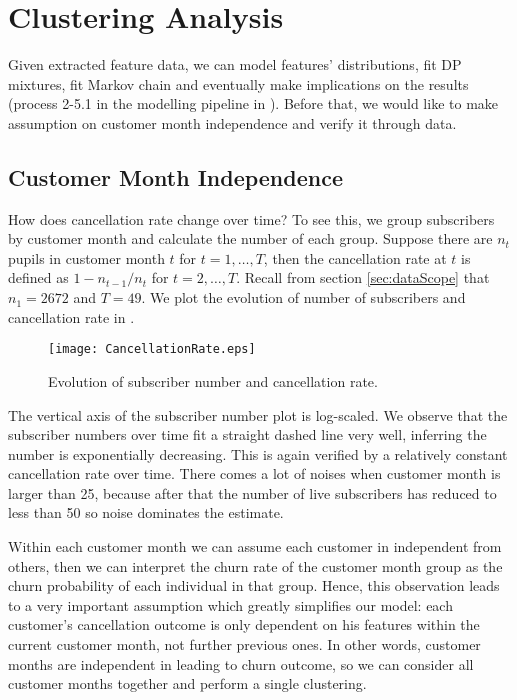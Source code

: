 \section{Clustering Analysis}
\label{sec:clustering}

Given extracted feature data, we can model features' distributions, fit DP mixtures, fit Markov chain and eventually make implications on the results (process 2-5.1 in the modelling pipeline in ). Before that, we would like to make assumption on customer month independence and verify it through data.

\subsection{Customer Month Independence}

How does cancellation rate change over time? To see this, we group subscribers by customer month and calculate the number of each group. Suppose there are $n_t$ pupils in customer month $t$ for $t=1,\dots,T$, then the cancellation rate at $t$ is defined as $1-n_{t-1} / n_t$ for $t=2,\dots, T$. Recall from section \ref{sec:dataScope} that $n_1 = 2672$ and $T = 49$. We plot the evolution of number of subscribers and cancellation rate in .

\begin{figure}[!h]
\centering
\texttt{[image: CancellationRate.eps]}
\caption{Evolution of subscriber number and cancellation rate.}
\label{fig:cancellationRate}
\end{figure}

The vertical axis of the subscriber number plot is log-scaled. We observe that the subscriber numbers over time fit a straight dashed line very well, inferring the number is exponentially decreasing. This is again verified by a relatively constant cancellation rate over time. There comes a lot of noises when customer month is larger than 25, because after that the number of live subscribers has reduced to less than 50 so noise dominates the estimate.

Within each customer month we can assume each customer in independent from others, then we can interpret the churn rate of the customer month group as the churn probability of each individual in that group. Hence, this observation leads to a very important assumption which greatly simplifies our model: each customer's cancellation outcome is only dependent on his features within the current customer month, not further previous ones. In other words, customer months are independent in leading to churn outcome, so we can consider all customer months together and perform a single clustering. %

